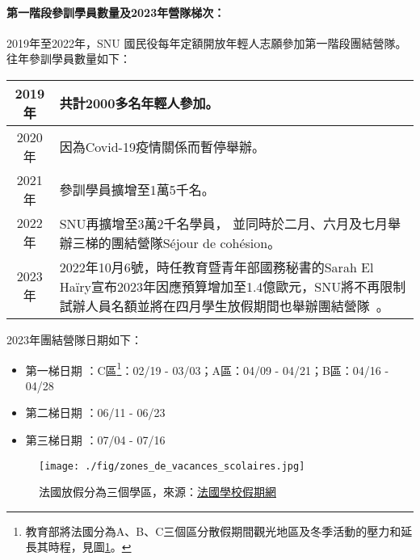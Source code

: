 \documentclass[a4paper,14pt]{extarticle}
\theoremstyle{plain}
\theoremstyle{remark}
\numberwithin{equation}{section}
\begin{document}
\paragraph{第一階段參訓學員數量及2023年營隊梯次：}

2019年至2022年，SNU 國民役每年定額開放年輕人志願參加第一階段團結營隊。往年參訓學員數量如下：

\begin{center}
\begin{tabularx}{0.8\textwidth}{| c | X |}
  \hline
  2019年 & 共計2000多名年輕人參加。
  \\ 
  \hline
  2020年 & 因為Covid-19疫情關係而暫停舉辦。
  \\ 
  \hline 
  2021年 & 參訓學員擴增至1萬5千名。%
  \\ 
  \hline 
  2022年 & SNU再擴增至3萬2千名學員，%
		並同時於二月、六月及七月舉辦三梯的團結營隊Séjour de cohésion。
    \\ 
    \hline
  2023年 &
	 2022年10月6號，時任教育暨青年部國務秘書的Sarah El Haïry宣布2023年因應預算增加至1.4億歐元，SNU將不再限制試辦人員名額並將在四月學生放假期間也舉辦團結營隊~\cite{20minutes_221006}。
   \\ \hline
\end{tabularx}
\end{center}

		2023年團結營隊日期\cite{snu_officiel}如下：
		\begin{itemize}
      \item 第一梯日期 ：C區\footnote{教育部將法國分為A、B、C三個區分散假期間觀光地區及冬季活動的壓力和延長其時程，見圖\ref{fig:zones_de_vacances_scolaires}。}：02/19 - 03/03；A區：04/09 - 04/21；B區：04/16 - 04/28
			\item 第二梯日期 ：06/11 - 06/23
			\item 第三梯日期 ：07/04 - 07/16
		\end{itemize}
		

%
%

    \begin{figure}[H]
		\centering
		\texttt{[image: ./fig/zones\_de\_vacances\_scolaires.jpg]}
    \caption{法國放假分為三個學區，來源：\href{https://www.vacances-scolaires-education.fr}{法國學校假期網}}
		\label{fig:zones_de_vacances_scolaires}
  	\end{figure}
\end{document}
